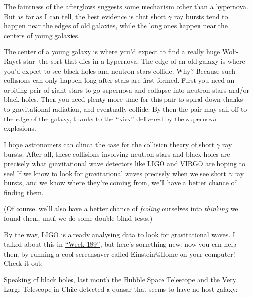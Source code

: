 \documentclass{article}
\def\tightlist{}
\renewcommand{\texttt}[1]{%
  \begingroup
  \ttfamily
  \begingroup\lccode`~=`/\lowercase{\endgroup\def~}{/\discretionary{}{}{}}%
  \begingroup\lccode`~=`[\lowercase{\endgroup\def~}{[\discretionary{}{}{}}%
  \begingroup\lccode`~=`.\lowercase{\endgroup\def~}{.\discretionary{}{}{}}%
  \catcode`/=\active\catcode`[=\active\catcode`.=\active
  \scantokens{#1\noexpand}%
  \endgroup
}
\begin{document}
The faintness of the afterglows suggests some mechanism other than a
hypernova. But as far as I can tell, the best evidence is that short
\(\gamma\) ray bursts tend to happen near the edges of old galaxies,
while the long ones happen near the centers of young galaxies.

The center of a young galaxy is where you'd expect to find a really huge
Wolf-Rayet star, the sort that dies in a hypernova. The edge of an old
galaxy is where you'd expect to see black holes and neutron stars
collide. Why? Because such collisions can only happen long after stars
are first formed. First you need an orbiting pair of giant stars to go
supernova and collapse into neutron stars and/or black holes. Then you
need plenty more time for this pair to spiral down thanks to
gravitational radiation, and eventually collide. By then the pair may
sail off to the edge of the galaxy, thanks to the ``kick'' delivered by
the supernova explosions.

I hope astronomers can clinch the case for the collision theory of short
\(\gamma\) ray bursts. After all, these collisions involving neutron
stars and black holes are precisely what gravitational wave detectors
like LIGO and VIRGO are hoping to see! If we know to look for
gravitational waves precisely when we see short \(\gamma\) ray bursts,
and we know where they're coming from, we'll have a better chance of
finding them.

(Of course, we'll also have a better chance of \emph{fooling} ourselves
into \emph{thinking} we found them, until we do some double-blind
tests.)

By the way, LIGO is already analysing data to look for gravitational
waves. I talked about this in \protect\hyperlink{week189}{``Week 189''},
but here's something new: now you can help them by running a cool
screensaver called Einstein@Home on your computer! Check it out:


Speaking of black holes, last month the Hubble Space Telescope and the
Very Large Telescope in Chile detected a quasar that seems to have no
host galaxy:

\end{document}
